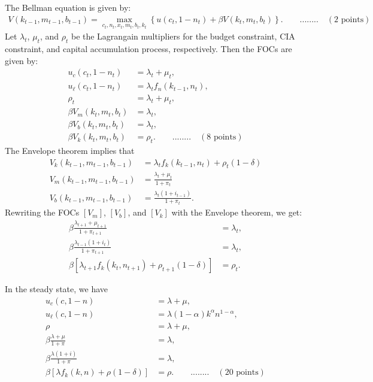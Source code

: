 \documentclass[12pt]{article}
\begin{document}
The Bellman equation is given by:
\begin{align*}
    V(k_{t-1}, m_{t-1}, b_{t-1}) = \max_{c_t, n_t, x_t, m_t, b_t, k_t} \left\{ u(c_t, 1-n_t) + \beta V(k_t, m_t, b_t) \right\}. \qquad ........ \quad(2 \text{ points})
\end{align*}
Let $\lambda_t$, $\mu_t$, and $\rho_t$ be the Lagrangain multipliers for the budget constraint, CIA constraint, and capital accumulation process, respectively. Then the FOCs are given by:
\begin{align*}
    u_c(c_t, 1-n_t) &= \lambda_t + \mu_t, \\
    u_{\ell}(c_t, 1-n_t) &= \lambda_t f_n(k_{t-1}, n_t), \\
    \rho_t &= \lambda_t + \mu_t, \\
    \beta V_m(k_t, m_t, b_t) &= \lambda_t, \\
    \beta V_b(k_t, m_t, b_t) &= \lambda_t, \\
    \beta V_k(k_t, m_t, b_t) &= \rho_t. \qquad ........ \quad(8 \text{ points})
\end{align*}
The Envelope theorem implies that
\begin{align*}
    V_k(k_{t-1}, m_{t-1}, b_{t-1}) &= \lambda_t f_k(k_{t-1}, n_t) + \rho_t(1-\delta) \\
    V_m(k_{t-1}, m_{t-1}, b_{t-1}) &= \frac{\lambda_t + \mu_t}{1+\pi_t}\\
    V_b(k_{t-1}, m_{t-1}, b_{t-1}) &= \frac{\lambda_t(1+i_{t-1})}{1+\pi_t}.
\end{align*}
Rewriting the FOCs $[V_m]$, $[V_b]$, and $[V_k]$ with the Envelope theorem, we get:
\begin{align*}
    \beta \frac{\lambda_{t+1}+\mu_{t+1}}{1+\pi_{t+1}} &= \lambda_t, \\
    \beta \frac{\lambda_{t-1}(1+i_t)}{1+\pi_{t+1}} &= \lambda_t,\\
    \beta [\lambda_{t+1} f_k(k_{t}, n_{t+1}) + \rho_{t+1}(1-\delta)] &= \rho_t.
\end{align*}

In the steady state, we have
\begin{align*}
    u_c(c, 1-n) &= \lambda + \mu, \\
    u_{\ell}(c, 1-n) &= \lambda (1-\alpha) k^{\alpha} n^{1-\alpha}, \\
    \rho &= \lambda + \mu, \\
    \beta \frac{\lambda + \mu}{1+\pi} &= \lambda, \\
    \beta \frac{\lambda(1+i)}{1+\pi} &= \lambda, \\
    \beta [\lambda f_k(k, n) + \rho(1-\delta)] &= \rho. \qquad ........ \quad(20 \text{ points})
\end{align*}
\end{document}
